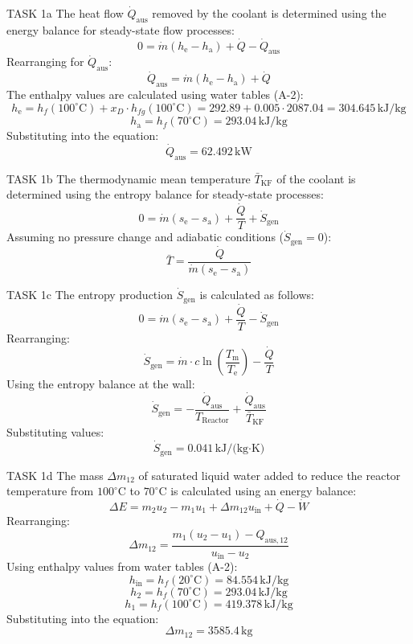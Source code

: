 TASK 1a  
The heat flow \( \dot{Q}_{\text{aus}} \) removed by the coolant is determined using the energy balance for steady-state flow processes:  
\[
0 = \dot{m} (h_{\text{e}} - h_{\text{a}}) + \dot{Q} - \dot{Q}_{\text{aus}}
\]  
Rearranging for \( \dot{Q}_{\text{aus}} \):  
\[
\dot{Q}_{\text{aus}} = \dot{m} (h_{\text{e}} - h_{\text{a}}) + \dot{Q}
\]  
The enthalpy values are calculated using water tables (A-2):  
\[
h_{\text{e}} = h_f(100^\circ\text{C}) + x_D \cdot h_{fg}(100^\circ\text{C}) = 292.89 + 0.005 \cdot 2087.04 = 304.645 \, \text{kJ/kg}
\]  
\[
h_{\text{a}} = h_f(70^\circ\text{C}) = 293.04 \, \text{kJ/kg}
\]  
Substituting into the equation:  
\[
\dot{Q}_{\text{aus}} = 62.492 \, \text{kW}
\]  

TASK 1b  
The thermodynamic mean temperature \( \bar{T}_{\text{KF}} \) of the coolant is determined using the entropy balance for steady-state processes:  
\[
0 = \dot{m} (s_{\text{e}} - s_{\text{a}}) + \frac{\dot{Q}}{T} + \dot{S}_{\text{gen}}
\]  
Assuming no pressure change and adiabatic conditions (\( \dot{S}_{\text{gen}} = 0 \)):  
\[
\bar{T} = \frac{\dot{Q}}{\dot{m} (s_{\text{e}} - s_{\text{a}})}
\]  

TASK 1c  
The entropy production \( \dot{S}_{\text{gen}} \) is calculated as follows:  
\[
0 = \dot{m} (s_{\text{e}} - s_{\text{a}}) + \frac{\dot{Q}}{T} - \dot{S}_{\text{gen}}
\]  
Rearranging:  
\[
\dot{S}_{\text{gen}} = \dot{m} \cdot c \ln \left( \frac{T_{\text{m}}}{T_{\text{e}}} \right) - \frac{\dot{Q}}{T}
\]  
Using the entropy balance at the wall:  
\[
\dot{S}_{\text{gen}} = -\frac{\dot{Q}_{\text{aus}}}{T_{\text{Reactor}}} + \frac{\dot{Q}_{\text{aus}}}{\bar{T}_{\text{KF}}}
\]  
Substituting values:  
\[
\dot{S}_{\text{gen}} = 0.041 \, \text{kJ/(kg·K)}
\]  

TASK 1d  
The mass \( \Delta m_{12} \) of saturated liquid water added to reduce the reactor temperature from \( 100^\circ\text{C} \) to \( 70^\circ\text{C} \) is calculated using an energy balance:  
\[
\Delta E = m_2 u_2 - m_1 u_1 + \Delta m_{12} u_{\text{in}} + \dot{Q} - \dot{W}
\]  
Rearranging:  
\[
\Delta m_{12} = \frac{m_1 (u_2 - u_1) - Q_{\text{aus},12}}{u_{\text{in}} - u_2}
\]  
Using enthalpy values from water tables (A-2):  
\[
h_{\text{in}} = h_f(20^\circ\text{C}) = 84.554 \, \text{kJ/kg}
\]  
\[
h_2 = h_f(70^\circ\text{C}) = 293.04 \, \text{kJ/kg}
\]  
\[
h_1 = h_f(100^\circ\text{C}) = 419.378 \, \text{kJ/kg}
\]  
Substituting into the equation:  
\[
\Delta m_{12} = 3585.4 \, \text{kg}
\]